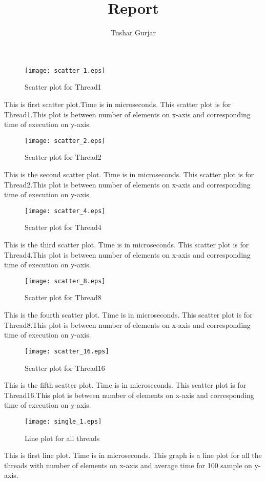 \documentclass[a4paper, 10pt]{report}
\title{Report}
\author{Tushar Gurjar}
\date{}
\begin{document}
\maketitle
 


\begin{figure}
\centering
\texttt{[image: scatter\_1.eps]}
 \caption{Scatter plot for Thread1}
 \label{fig:scatter_1}
\end{figure}
This is first scatter plot.Time is in microseconds.
This scatter plot is for Thread1.This plot is between number of elements on x-axis and corresponding time of execution on y-axis.
\newpage
\begin{figure}
\centering
\texttt{[image: scatter\_2.eps]}
 \caption{Scatter plot for Thread2}
 \label{fig:scatter_2}
\end{figure}
This is the second scatter plot. Time is in microseconds.
This scatter plot is for Thread2.This plot is between number of elements on x-axis and corresponding time of execution on y-axis.
\newpage
\begin{figure}
\centering
\texttt{[image: scatter\_4.eps]}
 \caption{Scatter plot for Thread4}
 \label{fig:scatter_4}
\end{figure}
This is the third scatter plot. Time is in microseconds.
This scatter plot is for Thread4.This plot is between number of elements on x-axis and corresponding time of execution on y-axis.
\newpage
\begin{figure}
\centering
\texttt{[image: scatter\_8.eps]}
 \caption{Scatter plot for Thread8}
 \label{fig:scatter_8}
\end{figure}
This is the fourth scatter plot. Time is in microseconds.
This scatter plot is for Thread8.This plot is between number of elements on x-axis and corresponding time of execution on y-axis.
\newpage
\begin{figure}
\centering
\texttt{[image: scatter\_16.eps]}
 \caption{Scatter plot for Thread16}
 \label{fig:scatter_16}
\end{figure}
This is the fifth scatter plot. Time is in microseconds.
This scatter plot is for Thread16.This plot is between number of elements on x-axis and corresponding time of execution on y-axis.






\newpage
\begin{figure}
\centering

\texttt{[image: single\_1.eps]}
 \caption{Line plot for all threads}
 \label{fig:single_1}
\end{figure}
This is first line plot. Time is in microseconds.
This graph is a line plot for all the threads with number of elements on x-axis and average time for 100 sample on y-axis.
\end{document}
